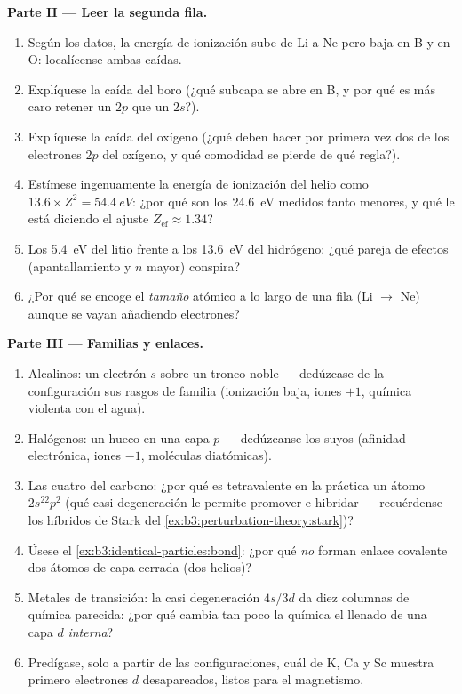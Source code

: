 \begin{problem}
\medskip\noindent\textbf{Parte II --- Leer la segunda fila.}
\begin{enumerate}[resume]
  \item Según los datos, la energía de ionización sube de Li a Ne pero
        baja en B y en O: localícense ambas caídas.
  \item Explíquese la caída del boro (¿qué subcapa se abre en B, y por qué
        es más caro retener un $2p$ que un $2s$?).
  \item Explíquese la caída del oxígeno (¿qué deben hacer por primera vez
        dos de los electrones $2p$ del oxígeno, y qué comodidad se pierde
        de qué regla?).
  \item Estímese ingenuamente la energía de ionización del helio como
        $13.6 \times Z^2 = \qty{54.4}{eV}$: ¿por qué son los
        \qty{24.6}{eV} medidos tanto menores, y qué le está diciendo el
        ajuste $Z_{\text{ef}} \approx 1.34$?
  \item Los \qty{5.4}{eV} del litio frente a los \qty{13.6}{eV} del
        hidrógeno: ¿qué pareja de efectos (apantallamiento y $n$ mayor)
        conspira?
  \item ¿Por qué se encoge el \emph{tamaño} atómico a lo largo de una fila
        (Li $\to$ Ne) aunque se vayan añadiendo electrones?
\end{enumerate}

\medskip\noindent\textbf{Parte III --- Familias y enlaces.}
\begin{enumerate}[resume]
  \item Alcalinos: un electrón $s$ sobre un tronco noble --- dedúzcase
        de la configuración sus rasgos de familia (ionización baja, iones
        $+1$, química violenta con el agua).
  \item Halógenos: un hueco en una capa $p$ --- dedúzcanse los suyos
        (afinidad electrónica, iones $-1$, moléculas diatómicas).
  \item Las cuatro del carbono: ¿por qué es tetravalente en la práctica un
        átomo $2s^22p^2$ (qué casi degeneración le permite promover e
        hibridar --- recuérdense los híbridos de Stark del
        \cref{ex:b3:perturbation-theory:stark})?
  \item Úsese el \cref{ex:b3:identical-particles:bond}: ¿por qué \emph{no}
        forman enlace covalente dos átomos de capa cerrada (dos helios)?
  \item Metales de transición: la casi degeneración $4s$/$3d$ da diez
        columnas de química parecida: ¿por qué cambia tan poco la química
        el llenado de una capa $d$ \emph{interna}?
  \item Predígase, solo a partir de las configuraciones, cuál de K, Ca y Sc
        muestra primero electrones $d$ desapareados, listos para el
        magnetismo.
\end{enumerate}


\end{problem}
